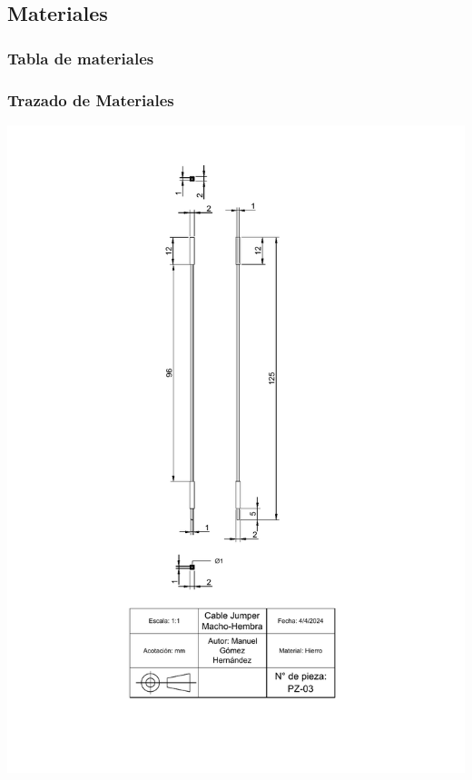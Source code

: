 \subsection{Materiales}


\subsubsection{Tabla de materiales}

\subsubsection{Trazado de Materiales }

\includegraphics[width=.9\textwidth]{15/img/cableJumperMHTrazo.pdf}~\\[15cm]
